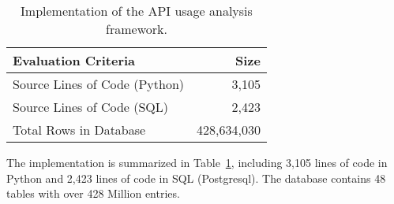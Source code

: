 
\begin{table}[t]
\footnotesize
\centering
\begin{tabular}{p{2.45in} r}
\toprule
\textbf{Evaluation Criteria} & \textbf{Size}\\
\midrule
\addlinespace
Source Lines of Code (Python) & 3,105 \\
\addlinespace
Source Lines of Code (SQL) & 2,423 \\
\addlinespace
Total Rows in Database & 428,634,030 \\
\bottomrule
\end{tabular}%
\caption{Implementation of the API usage analysis framework.}
\label{tab:syspop:eval}%
\end{table}%

The implementation is summarized in Table~\ref{tab:syspop:eval}, including 3,105 lines of code in Python and 2,423 lines of code in SQL (Postgresql).
The database contains 48 tables with over 428 Million entries.
